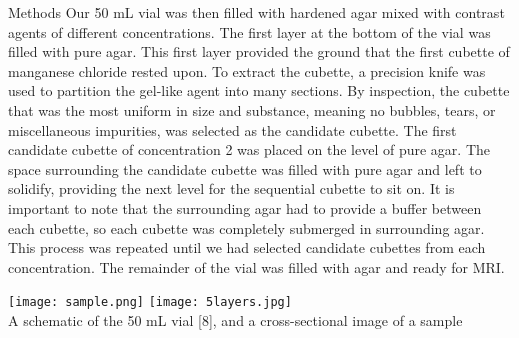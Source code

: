 \documentclass[a4paper,12pt]{article}
\begin{document}
\begin{section}{Methods}
Our 50 mL vial was then filled with hardened agar mixed with contrast agents of different concentrations. The first layer at the bottom of the vial was filled with pure agar. This first layer provided the ground that the first cubette of manganese chloride rested upon. To extract the cubette, a precision knife was used to partition the gel-like agent into many sections. By inspection, the cubette that was the most uniform in size and substance, meaning no bubbles, tears, or miscellaneous impurities, was selected as the candidate cubette. The first candidate cubette of concentration 2 was placed on the level of pure agar. The space surrounding the candidate cubette was filled with pure agar and left to solidify, providing the next level for the sequential cubette to sit on. It is important to note that the surrounding agar had to provide a buffer between each cubette, so each cubette was completely submerged in surrounding agar. This process was repeated until we had selected candidate cubettes from each concentration. The remainder of the vial was filled with agar and ready for MRI. \\

\begin{center}
\texttt{[image: sample.png]}
\hspace{25mm}
\texttt{[image: 5layers.jpg]} \\
\small{A schematic of the 50 mL vial [8], and a cross-sectional image of a sample}
\end{center}

\end{section}
\end{document}
